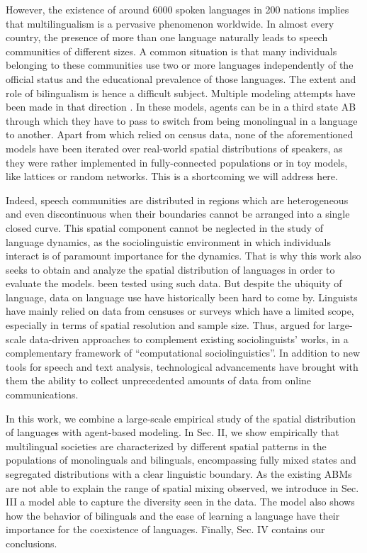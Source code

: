 \documentclass[../thesis.tex]{subfiles}
\begin{document}
However, the existence of around \SI{6000}{} spoken languages in 200 nations implies
that multilingualism is a pervasive phenomenon worldwide. In almost every country, the
presence of more than one language naturally leads to speech communities of different
sizes. A common situation is that many individuals belonging to these communities use
two or more languages independently of the official status and the educational
prevalence of those languages. The extent and role of bilingualism is hence a difficult
subject. Multiple modeling attempts have been made in that direction
\cite{CastelloOrderingDynamics2006,PatriarcaInfluenceGeography2009,PatriarcaModelingTwolanguage2012,VazquezAgentBased2010}.
In these models, agents can be in a third state AB through which they have to pass to
switch from being monolingual in a language to another. Apart from
\cite{ProchazkaQuantifyingDriving2017} which relied on census data, none of the
aforementioned models have been iterated over real-world spatial distributions of
speakers, as they were rather implemented in fully-connected populations or in toy
models, like lattices or random networks. This is a shortcoming we will address here.

Indeed, speech communities are distributed in regions which are heterogeneous and even
discontinuous when their boundaries cannot be arranged into a single closed curve. This
spatial component cannot be neglected in the study of language dynamics, as the
sociolinguistic environment in which individuals interact is of paramount importance for
the dynamics. That is why this work also seeks to obtain and analyze the spatial
distribution of languages in order to evaluate the models. %
been tested using such data. But despite the ubiquity of language, data on language use
have historically been hard to come by. Linguists have mainly relied on data from
censuses or surveys which have a limited scope, especially in terms of spatial
resolution and sample size. Thus, \cite{NguyenComputationalSociolinguistics2016} argued
for large-scale data-driven approaches to complement existing sociolinguists' works, in
a complementary framework of ``computational sociolinguistics''. In addition to new
tools for speech and text analysis, technological advancements have brought with them
the ability to collect unprecedented amounts of data from online communications.

In this work, we combine a large-scale empirical study of the spatial distribution of
languages with agent-based modeling. In Sec. II, we show empirically that multilingual
societies are characterized by different spatial patterns in the populations of
monolinguals and bilinguals, encompassing fully mixed states and segregated
distributions with a clear linguistic boundary. As the existing ABMs are not able to
explain the range of spatial mixing observed, we introduce in Sec. III a model able to
capture the diversity seen in the data. The model also shows how the behavior of
bilinguals and the ease of learning a language have their importance for the coexistence
of languages. Finally, Sec. IV contains our conclusions.
\end{document}
